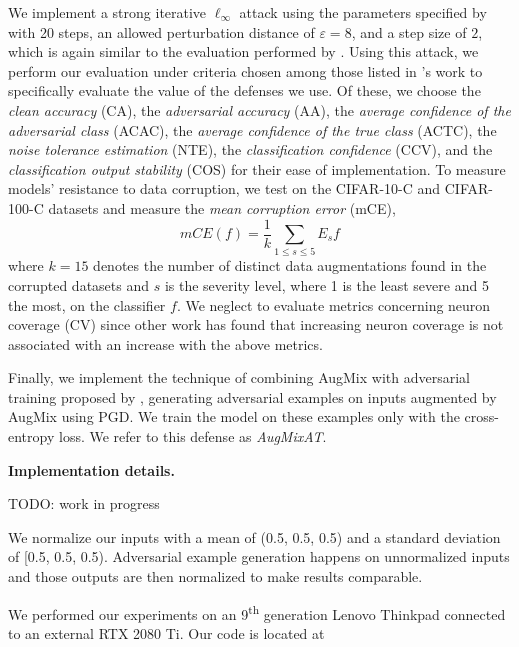 \documentclass[a4paper]{article}
\begin{document}
We implement a strong iterative $\ell_\infty$ attack using the parameters 
specified by \textcite{madry2018deeplearningmodelsresistant}
with 20 steps, an allowed perturbation distance of $\varepsilon = 8$, and a
step size of $2$, which is again similar to the evaluation performed by
\citeauthor{zhang2019trades}. Using this attack, we perform our evaluation
under criteria chosen among those listed in 
\textcite{guo2022comprehensive}'s work to specifically evaluate the value of the
defenses we use. Of these, we choose the \textit{clean accuracy} (CA), the
\textit{adversarial accuracy} (AA), the \textit{average confidence of the
adversarial class} (ACAC), the \textit{average confidence of the true class}
(ACTC), the \textit{noise tolerance estimation} (NTE), the
\textit{classification confidence} (CCV), and the
\textit{classification output stability} (COS) for their ease of implementation.
To measure models' resistance to data corruption, we test on the CIFAR-10-C and
CIFAR-100-C datasets and
measure the \textit{mean corruption error} (mCE),
\begin{equation}
mCE(f) = \frac 1 k \sum_{1 \leq s \leq 5} E_s f
\end{equation}
where $k = 15$ denotes the number of distinct data augmentations found in
the corrupted datasets and $s$ is the severity level, where 1 is the least
severe and 5 the most, on the classifier $f$. We neglect to evaluate metrics
concerning neuron coverage (CV) since other work \cite{yang2022revisiting}
has found that increasing neuron coverage is not associated with an increase
with the above metrics.

Finally, we implement the technique of combining AugMix with adversarial training
proposed by \textcite{gowal2021uncovering}, generating adversarial examples on
inputs augmented by AugMix using PGD. We train the model on these examples only
with the cross-entropy loss. We refer to this defense as \textit{AugMixAT}.

\noindent\textbf{Implementation details.}

TODO: work in progress

We normalize our inputs with a mean of (0.5, 0.5, 0.5) and a standard deviation of
[0.5, 0.5, 0.5). Adversarial example generation happens on unnormalized inputs and those outputs are then normalized to make results comparable.



We performed our experiments on an 9\textsuperscript{th} generation Lenovo
Thinkpad connected to an external RTX 2080 Ti. Our code is located at
\end{document}
